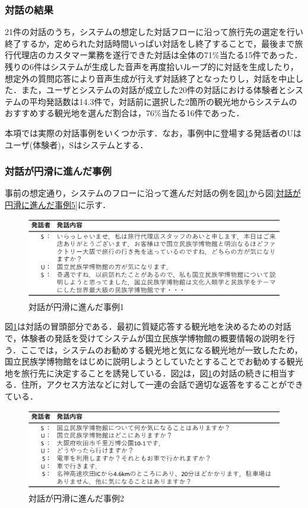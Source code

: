 \subsubsection{対話の結果}
21件の対話のうち，システムの想定した対話フローに沿って旅行先の選定を行い終了するか，定められた対話時間いっぱい対話をし終了することで，最後まで旅行代理店のカスタマー業務を遂行できた対話は全体の71\%当たる15件であった．残りの6件はシステムが生成した音声を再度拾いループ的に対話を生成したり，想定外の質問応答により音声生成が行えず対話終了となったりし，対話を中止した．また，ユーザとシステムの対話が成立した20件の対話における体験者とシステムの平均発話数は14.3件で，対話前に選択した2箇所の観光地からシステムのおすすめする観光地を選んだ割合は，76\%当たる16件であった．

本項では実際の対話事例をいくつか示す．なお，事例中に登場する発話者のUはユーザ(体験者)，Sはシステムとする．
\subsubsection*{対話が円滑に進んだ事例}
事前の想定通り，システムのフローに沿って進んだ対話の例を図\ref{対話が円滑に進んだ事例1}から図\ref{対話が円滑に進んだ事例5}に示す．

\begin{figure}[th]
    \centering
    \includegraphics[scale=0.5]{pic/example01.pdf}
    \caption{対話が円滑に進んだ事例1}
    \label{対話が円滑に進んだ事例1}
\end{figure}

図\ref{対話が円滑に進んだ事例1}は対話の冒頭部分である．最初に質疑応答する観光地を決めるための対話で，体験者の発話を受けてシステムが国立民族学博物館の概要情報の説明を行う．ここでは，システムのお勧めする観光地と気になる観光地が一致したため，国立民族学博物館をはじめに説明しようとしていたとすることでお勧めする観光地を旅行先に決定することを誘発している．図\ref{対話が円滑に進んだ事例2}は，図\ref{対話が円滑に進んだ事例1}の対話の続きに相当する．住所，アクセス方法などに対して一連の会話で適切な返答をすることができている．

\begin{figure}[th]
    \centering
    \includegraphics[scale=0.5]{pic/example02.pdf}
    \caption{対話が円滑に進んだ事例2}
    \label{対話が円滑に進んだ事例2}
\end{figure}

